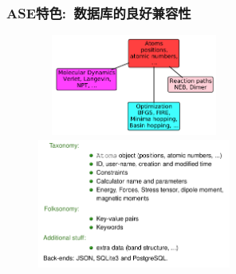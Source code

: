 \frame
{
\frametitle{\textrm{ASE}特色:~数据库的良好兼容性}
\begin{minipage}[b]{0.38\textwidth}
{\fontsize{7.5pt}{5.2pt}}
\end{minipage}
\hfill
\begin{minipage}[b]{0.60\textwidth}
\begin{figure}[h!]
\centering
\vspace*{-0.10in}
\includegraphics[height=1.3in,width=2.5in,viewport=0 0 838 500,clip]{Figures/ASE_opt_modules.png}
\vskip 1pt
\includegraphics[height=1.7in,width=2.5in,viewport=0 0 938 630,clip]{Figures/ASE_database.png}
\label{ASE_opt-database}
\end{figure} 
\end{minipage}
}

